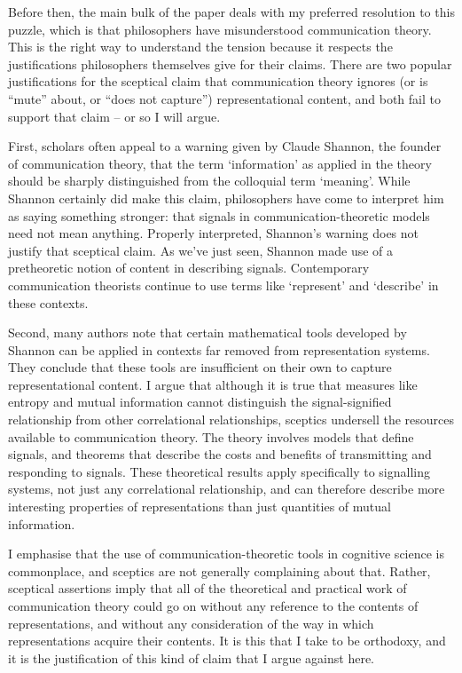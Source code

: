 \documentclass[12pt]{article}
\begin{document}
Before then, the main bulk of the paper deals with my preferred resolution to this puzzle, which is that philosophers have misunderstood communication theory.
This is the right way to understand the tension because it respects the justifications philosophers themselves give for their claims.
There are two popular justifications for the sceptical claim that communication theory ignores (or is ``mute'' about, or ``does not capture'') representational content, and both fail to support that claim -- or so I will argue.

First, scholars often appeal to a warning given by Claude Shannon, the founder of communication theory, that the term `information' as applied in the theory should be sharply distinguished from the colloquial term `meaning'.
While Shannon certainly did make this claim, philosophers have come to interpret him as saying something stronger: that signals in communication-theoretic models need not mean anything.
Properly interpreted, Shannon's warning does not justify that sceptical claim.
As we've just seen, Shannon made use of a pretheoretic notion of content in describing signals.
Contemporary communication theorists continue to use terms like `represent' and `describe' in these contexts.

Second, many authors note that certain mathematical tools developed by Shannon can be applied in contexts far removed from representation systems.
They conclude that these tools are insufficient on their own to capture representational content.
I argue that although it is true that measures like entropy and mutual information cannot distinguish the signal-signified relationship from other correlational relationships, sceptics undersell the resources available to communication theory.
The theory involves models that define signals, and theorems that describe the costs and benefits of transmitting and responding to signals.
These theoretical results apply specifically to signalling systems, not just any correlational relationship, and can therefore describe more interesting properties of representations than just quantities of mutual information.

I emphasise that the use of communication-theoretic tools in cognitive science is commonplace, and sceptics are not generally complaining about that.
Rather, sceptical assertions imply that all of the theoretical and practical work of communication theory could go on without any reference to the contents of representations, and without any consideration of the way in which representations acquire their contents.
It is this that I take to be orthodoxy, and it is the justification of this kind of claim that I argue against here.
\end{document}
